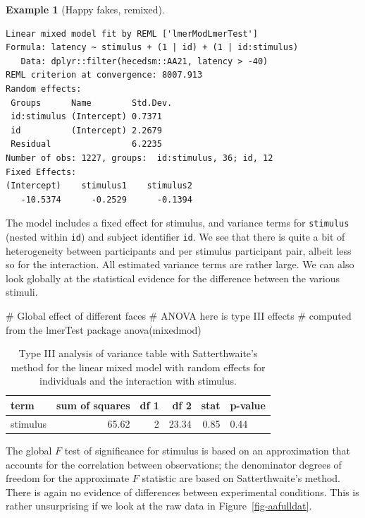 \documentclass[
  11pt,
  letterpaper,
]{scrbook}
\newenvironment{Shaded}{\begin{snugshade}}{\end{snugshade}}
\newcommand{\CommentTok}[1]{\textcolor[rgb]{0.37,0.37,0.37}{#1}}
\newcommand{\FunctionTok}[1]{\textcolor[rgb]{0.28,0.35,0.67}{#1}}
\newcommand{\NormalTok}[1]{\textcolor[rgb]{0.00,0.23,0.31}{#1}}
\theoremstyle{definition}
\theoremstyle{definition}
\newtheorem{example}{Example}[chapter]
\theoremstyle{remark}
\begin{document}
\begin{example}[Happy fakes,
remixed]
\begin{verbatim}
Linear mixed model fit by REML ['lmerModLmerTest']
Formula: latency ~ stimulus + (1 | id) + (1 | id:stimulus)
   Data: dplyr::filter(hecedsm::AA21, latency > -40)
REML criterion at convergence: 8007.913
Random effects:
 Groups      Name        Std.Dev.
 id:stimulus (Intercept) 0.7371  
 id          (Intercept) 2.2679  
 Residual                6.2235  
Number of obs: 1227, groups:  id:stimulus, 36; id, 12
Fixed Effects:
(Intercept)    stimulus1    stimulus2  
   -10.5374      -0.2529      -0.1394  
\end{verbatim}

The model includes a fixed effect for stimulus, and variance terms for
\texttt{stimulus} (nested within \texttt{id}) and subject identifier
\texttt{id}. We see that there is quite a bit of heterogeneity between
participants and per stimulus participant pair, albeit less so for the
interaction. All estimated variance terms are rather large. We can also
look globally at the statistical evidence for the difference between the
various stimuli.

\begin{Shaded}
\begin{Highlighting}[]
\CommentTok{\# Global effect of different faces}
\CommentTok{\# ANOVA here is type III effects }
\CommentTok{\# computed from the \textquotesingle{}lmerTest\textquotesingle{} package}
\FunctionTok{anova}\NormalTok{(mixedmod)}
\end{Highlighting}
\end{Shaded}

\begin{longtable}[]{@{}lrrrrl@{}}

\caption{\label{tbl-happyfake-rep-anova}Type III analysis of variance
table with Satterthwaite's method for the linear mixed model with random
effects for individuals and the interaction with stimulus.}

\tabularnewline

\toprule\noalign{}
term & sum of squares & df 1 & df 2 & stat & p-value \\
\midrule\noalign{}
\endhead
\bottomrule\noalign{}
\endlastfoot
stimulus & 65.62 & 2 & 23.34 & 0.85 & 0.44 \\

\end{longtable}

The global \(F\) test of significance for stimulus is based on an
approximation that accounts for the correlation between observations;
the denominator degrees of freedom for the approximate \(F\) statistic
are based on Satterthwaite's method. There is again no evidence of
differences between experimental conditions. This is rather unsurprising
if we look at the raw data in Figure~\ref{fig-aafulldat}.

\end{example}
\end{document}
